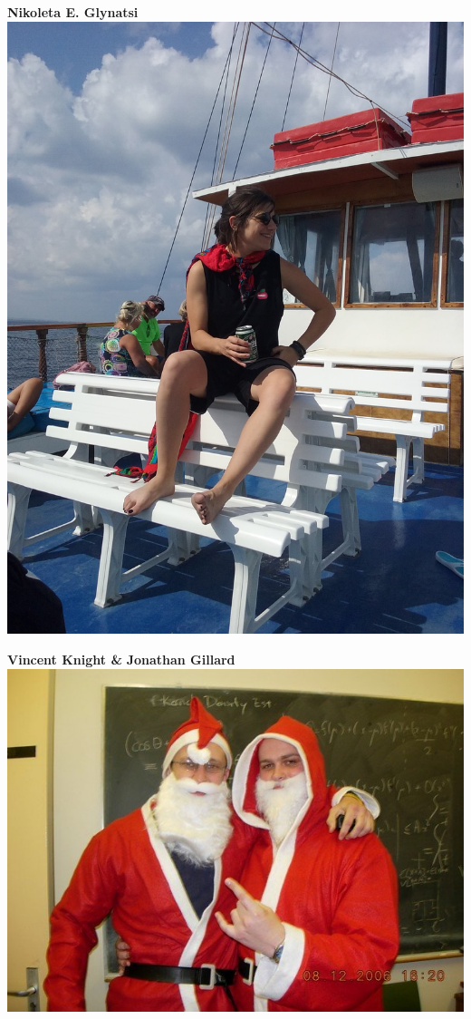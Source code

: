 \documentclass{beamer}
\begin{document}
 
\begin{frame}
    \centering
    \LARGE \textbf{Nikoleta E. Glynatsi} \\
    \vfill
    \includegraphics[width=.4\textwidth]{static/me.jpg}
\end{frame}

\begin{frame}
            \centering
            \Large \textbf{Vincent Knight \&} \textbf{Jonathan Gillard} \\
            \vspace{3mm}
            \includegraphics[width=.7\textwidth]{static/supervisors.jpg}
\end{frame}
\end{document}
